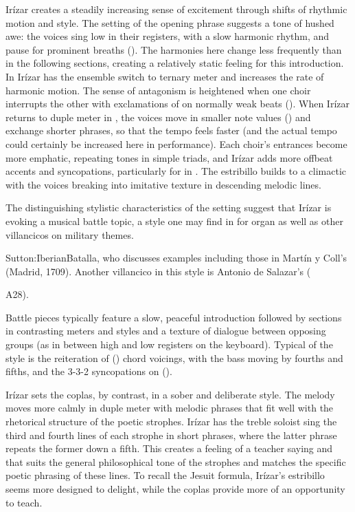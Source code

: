 Irízar creates a steadily increasing sense of excitement through shifts of 
rhythmic motion and style.
The setting of the opening phrase suggests a tone of hushed awe: the voices 
sing low in their registers, with a slow harmonic rhythm, and pause for 
prominent breaths ().
The harmonies here change less frequently than in the following sections, 
creating a relatively static feeling for this introduction.
In  Irízar has the ensemble switch to ternary meter and 
increases the rate of harmonic motion.
The sense of antagonism is heightened when one choir interrupts the other with 
exclamations of  on normally weak beats ().
When Irízar returns to duple meter in , the voices move in 
smaller note values () and exchange shorter phrases, so that the 
tempo feels faster (and the actual tempo could certainly be increased here in 
performance).
Each choir's entrances become more emphatic, repeating tones in simple triads, 
and Irízar adds more offbeat accents and syncopations, particularly for 
 in .
The estribillo builds to a climactic  with the voices breaking 
into imitative texture in descending melodic lines.

The distinguishing stylistic characteristics of the setting suggest that Irízar 
is evoking a musical battle topic, a style one may find in  for 
organ as well as other villancicos on military themes.%
\begin{Footnote}
    \Autocite[]{Grove}{Sutton:IberianBatalla}, who discusses 
    examples including those in Martín y Coll's  (Madrid, 1709).
    Another villancico in this style is Antonio de Salazar's  (\signature{MEX-Mc}{A28}).
\end{Footnote}
Battle pieces typically feature a slow, peaceful introduction followed by 
sections in contrasting meters and styles and a texture of dialogue between 
opposing groups (as in between high and low registers on the keyboard). 
Typical of the style is the reiteration of  () chord voicings, with the bass moving by fourths and fifths, and the 
3-3-2 syncopations on  
().

Irízar sets the coplas, by contrast, in a sober and deliberate style.
The melody moves more calmly in duple meter with melodic phrases that fit well 
with the rhetorical structure of the poetic strophes.
Irízar has the treble soloist sing the third and fourth lines of each strophe 
in short phrases, where the latter phrase repeats the former down a fifth.
This creates a feeling of a teacher saying  and 
 that suits the general philosophical tone of the 
strophes and matches the specific poetic phrasing of these lines.
To recall the Jesuit formula, Irízar's estribillo seems more designed to 
delight, while the coplas provide more of an opportunity to teach.


